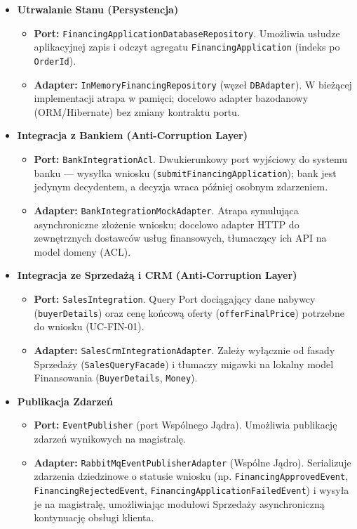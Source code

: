 \begin{itemize}
    \item \textbf{Utrwalanie Stanu (Persystencja)}
    \begin{itemize}
        \item \textbf{Port:} \texttt{FinancingApplicationDatabaseRepository}. Umożliwia usłudze aplikacyjnej zapis i odczyt agregatu \texttt{FinancingApplication} (indeks po \texttt{OrderId}).
        \item \textbf{Adapter:} \texttt{InMemoryFinancingRepository} (węzeł \texttt{DBAdapter}). W bieżącej implementacji atrapa w pamięci; docelowo adapter bazodanowy (ORM/Hibernate) bez zmiany kontraktu portu.
    \end{itemize}

    \item \textbf{Integracja z Bankiem (Anti-Corruption Layer)}
    \begin{itemize}
        \item \textbf{Port:} \texttt{BankIntegrationAcl}. Dwukierunkowy port wyjściowy do systemu banku — wysyłka wniosku (\texttt{submitFinancingApplication}); bank jest jedynym decydentem, a decyzja wraca później osobnym zdarzeniem.
        \item \textbf{Adapter:} \texttt{BankIntegrationMockAdapter}. Atrapa symulująca asynchroniczne złożenie wniosku; docelowo adapter HTTP do zewnętrznych dostawców usług finansowych, tłumaczący ich API na model domeny (ACL).
    \end{itemize}

    \item \textbf{Integracja ze Sprzedażą i CRM (Anti-Corruption Layer)}
    \begin{itemize}
        \item \textbf{Port:} \texttt{SalesIntegration}. Query Port dociągający dane nabywcy (\texttt{buyerDetails}) oraz cenę końcową oferty (\texttt{offerFinalPrice}) potrzebne do wniosku (UC-FIN-01).
        \item \textbf{Adapter:} \texttt{SalesCrmIntegrationAdapter}. Zależy wyłącznie od fasady Sprzedaży (\texttt{SalesQueryFacade}) i tłumaczy migawki na lokalny model Finansowania (\texttt{BuyerDetails}, \texttt{Money}).
    \end{itemize}

    \item \textbf{Publikacja Zdarzeń}
    \begin{itemize}
        \item \textbf{Port:} \texttt{EventPublisher} (port Wspólnego Jądra). Umożliwia publikację zdarzeń wynikowych na magistralę.
        \item \textbf{Adapter:} \texttt{RabbitMqEventPublisherAdapter} (Wspólne Jądro). Serializuje zdarzenia dziedzinowe o statusie wniosku (np. \texttt{FinancingApprovedEvent}, \texttt{FinancingRejectedEvent}, \texttt{FinancingApplicationFailedEvent}) i wysyła je na magistralę, umożliwiając modułowi Sprzedaży asynchroniczną kontynuację obsługi klienta.
    \end{itemize}
\end{itemize}

